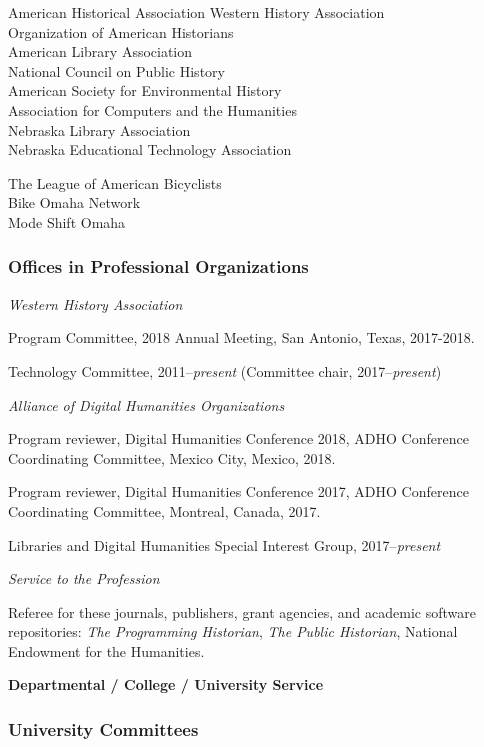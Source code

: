 American Historical Association Western History Association\\
Organization of American Historians\\
American Library Association\\
National Council on Public History\\
American Society for Environmental History\\
Association for Computers and the Humanities\\
Nebraska Library Association\\
Nebraska Educational Technology Association

The League of American Bicyclists\\
Bike Omaha Network\\
Mode Shift Omaha

\subsubsection{Offices in Professional
Organizations}\label{offices-in-professional-organizations}

\emph{Western History Association}

Program Committee, 2018 Annual Meeting, San Antonio, Texas, 2017-2018.

Technology Committee, 2011--\emph{present} (Committee chair,
2017--\emph{present})

\vspace{.4cm}

\emph{Alliance of Digital Humanities Organizations}

Program reviewer, Digital Humanities Conference 2018, ADHO Conference
Coordinating Committee, Mexico City, Mexico, 2018.

Program reviewer, Digital Humanities Conference 2017, ADHO Conference
Coordinating Committee, Montreal, Canada, 2017.

Libraries and Digital Humanities Special Interest Group,
2017--\emph{present}

\emph{Service to the Profession}

Referee for these journals, publishers, grant agencies, and academic
software repositories: \emph{The Programming Historian}, \emph{The
Public Historian}, National Endowment for the Humanities.

\textbf{Departmental / College / University Service}

\subsubsection{University Committees}\label{university-committees}

